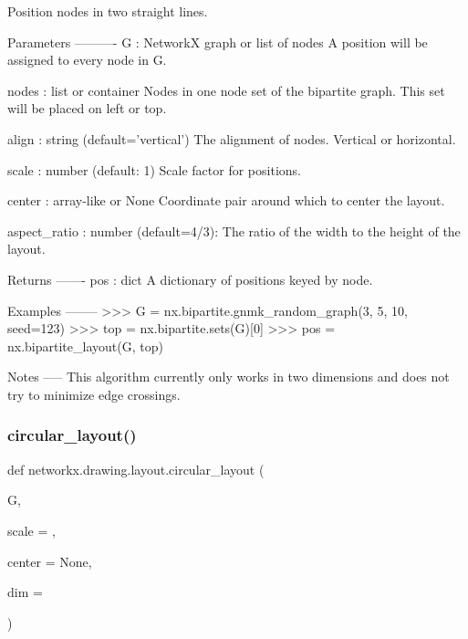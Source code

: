 \begin{DoxyVerb}Position nodes in two straight lines.

Parameters
----------
G : NetworkX graph or list of nodes
    A position will be assigned to every node in G.

nodes : list or container
    Nodes in one node set of the bipartite graph.
    This set will be placed on left or top.

align : string (default='vertical')
    The alignment of nodes. Vertical or horizontal.

scale : number (default: 1)
    Scale factor for positions.

center : array-like or None
    Coordinate pair around which to center the layout.

aspect_ratio : number (default=4/3):
    The ratio of the width to the height of the layout.

Returns
-------
pos : dict
    A dictionary of positions keyed by node.

Examples
--------
>>> G = nx.bipartite.gnmk_random_graph(3, 5, 10, seed=123)
>>> top = nx.bipartite.sets(G)[0]
>>> pos = nx.bipartite_layout(G, top)

Notes
-----
This algorithm currently only works in two dimensions and does not
try to minimize edge crossings.\end{DoxyVerb}
 \mbox{\label{namespacenetworkx_1_1drawing_1_1layout_ad5f2fac85819ae55ebd51de00e25bf75}} 
\subsubsection{\texorpdfstring{circular\+\_\+layout()}{circular\_layout()}}
{\footnotesize\ttfamily def networkx.\+drawing.\+layout.\+circular\+\_\+layout (\begin{DoxyParamCaption}\item[{}]{G,  }\item[{}]{scale = {},  }\item[{}]{center = {\ttfamily None},  }\item[{}]{dim = {} }\end{DoxyParamCaption})}

